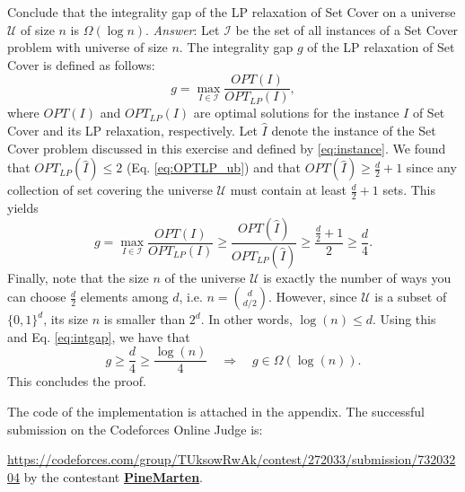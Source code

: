 \documentclass[10pt]{article}
\newenvironment{exercise}[2][Exercise]{\begin{trivlist}
  \item[\hskip \labelsep {\bfseries #1}\hskip \labelsep {\bfseries #2.}]}{\end{trivlist}}
\begin{document}
  \begin{exercise}{4c}
  Conclude that the integrality gap of the LP relaxation of Set Cover on a universe $\mathcal{U}$ of size $n$ is $\Omega(\log n)$. \newline
  \emph{Answer}: Let $\mathcal{I}$ be the set of all instances of a Set Cover problem with universe of size $n$. The integrality gap $g$ of the LP relaxation of Set Cover is defined as follows:
  \begin{displaymath}
  g = \max_{I\in \mathcal{I}} \frac{ OPT(I)}{OPT_{LP}(I)},
  \end{displaymath}
  where $OPT(I)$ and $OPT_{LP}(I)$ are optimal solutions for the instance $I$ of Set Cover and its LP relaxation, respectively. Let $\hat{I}$ denote the instance of the Set Cover problem discussed in this exercise and defined by \eqref{eq:instance}. We found that $OPT_{LP}(\hat{I}) \leq 2$ (Eq. \eqref{eq:OPTLP_ub}) and that $OPT(\hat{I}) \geq \frac{d}{2} + 1$ since any collection of set covering the universe $\mathcal{U}$ must contain at least $\frac{d}{2} + 1$ sets. This yields
  \begin{equation}
  \label{eq:intgap}
    g = \max_{I\in \mathcal{I}} \frac{ OPT(I)}{OPT_{LP}(I)} \geq \frac{ OPT(\hat{I})}{OPT_{LP}(\hat{I})} \geq \frac{\frac{d}{2}+1}{2} \geq \frac{d}{4}.
  \end{equation}
  Finally, note that the size $n$ of the universe $\mathcal{U}$  is exactly the number of ways you can choose $\frac{d}{2}$ elements among $d$, i.e. $n =\binom{d}{d/2}$. However, since $\mathcal{U}$ is a subset of $\{0,1\}^d$, its size $n$ is smaller than $2^d$. In other words, $\log(n) \leq d$. Using this and Eq. \eqref{eq:intgap}, we have that
  \begin{displaymath}
  g \geq \frac{d}{4} \geq \frac{\log(n)}{4} \quad \Rightarrow \quad g \in \Omega(\log(n)).
  \end{displaymath}
  This concludes the proof.
  
  \end{exercise}


 
 
  \begin{exercise}{5}
    The code of the implementation is attached in the appendix. The successful
    submission on the Codeforces Online Judge is: 

    \url{https://codeforces.com/group/TUksowRwAk/contest/272033/submission/73203204}
    by the contestant \href{https://codeforces.com/profile/PineMarten}{\textbf{\color{blue-violet}PineMarten}}.
  \end{exercise}
\end{document}
